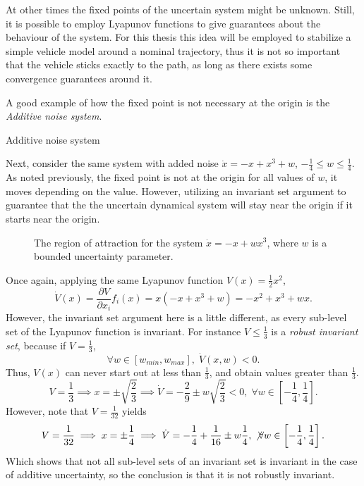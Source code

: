 At other times the fixed points of the uncertain system might be unknown. Still,
it is possible to employ Lyapunov functions to give guarantees about the
behaviour of the system. For this thesis this idea will be employed to stabilize
a simple vehicle model around a nominal trajectory, thus it is not so important
that the vehicle sticks exactly to the path, as long as there exists some
convergence guarantees around it.

A good example of how the fixed point is not necessary at the origin is the
\textit{Additive noise system}.

\begin{example}{Additive noise system}

  Next, consider the same system with added noise \(\dot{x} = -x + x^3 + w\),
  \(-\frac{1}{4} \leq w \leq \frac{1}{4}\). As noted previously, the fixed point
  is not at the origin for all values of \(w\), it moves depending on the value.
  However, utilizing an invariant set argument to guarantee that the the
  uncertain dynamical system will stay near the origin if it starts near the
  origin. 

\begin{figure}
    
    \caption{The region of attraction for the system \(\dot{x} = -x + wx^3\),
      where \(w\) is a bounded uncertainty parameter.}
\end{figure}
\end{example}

Once again, applying the same Lyapunov function \(V(x) = \frac{1}{2}x^2\),
\[
  \dot{V}(x) = \frac{\partial V}{\partial x_i} f_i(x) = x(-x + x^3 + w) = -x^2 +
  x^3 + wx.
\]
However, the invariant set argument here is a little different, as every
sub-level set of the Lyapunov function is invariant. For instance \(V \leq
\frac{1}{3}\) is a \textit{robust invariant set}, because if \(V =
\frac{1}{3}\), 
\[
 \forall w \in \left[ w_{min}, w_{max} \right], \; \dot{V}(x,w) < 0.
\]
Thus, \(V(x)\) can never start out at less than \(\frac{1}{3}\), and obtain
values greater than \(\frac{1}{3}\).
\[
  V = \frac{1}{3} \implies x = \pm \sqrt{\frac{2}{3}} \implies \dot{V} =
  -\frac{2}{9} \pm w \sqrt{\frac{2}{3}} < 0, \; \forall w \in \left[
    -\frac{1}{4}, \frac{1}{4} \right].
\]
However, note that \(V = \frac{1}{32}\) yields
\[
  V = \frac{1}{32} \implies x = \pm \frac{1}{4} \implies \dot{V} = -\frac{1}{4}
  + \frac{1}{16} \pm w\frac{1}{4}, \; \not \forall w \in \left[ -\frac{1}{4}, \frac{1}{4} \right].
\]
Which shows that not all sub-level sets of an invariant set is invariant in the
case of additive uncertainty, so the conclusion is that it is not robustly invariant.

